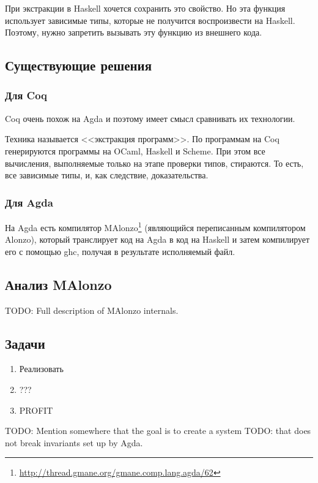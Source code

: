 При экстракции в Haskell хочется сохранить это свойство. Но эта функция
использует зависимые типы, которые не получится воспроизвести на Haskell.
Поэтому, нужно запретить вызывать эту функцию из внешнего кода.

\subsection{Существующие решения}

\subsubsection{Для Coq}

Coq очень похож на Agda и поэтому имеет смысл сравнивать их технологии.

Техника называется <<экстракция программ>>\cite{Let02}.
По программам на Coq генерируются программы на OCaml, Haskell и Scheme.
При этом все вычисления, выполняемые только на этапе проверки типов, стираются.
То есть, все зависимые типы, и, как следствие, доказательства.

\subsubsection{Для Agda}

На Agda есть компилятор
MAlonzo\footnote{\url{http://thread.gmane.org/gmane.comp.lang.agda/62}}
(являющийся переписанным компилятором Alonzo\cite{Ben07}), который транслирует
код на Agda в код на Haskell и затем компилирует его с помощью ghc, получая в
результате исполняемый файл.

\subsection{Анализ MAlonzo}

TODO: Full description of MAlonzo internals.

\subsection{Задачи}

\begin{enumerate}
\item Реализовать
\item ???
\item PROFIT
\end{enumerate}

TODO: Mention somewhere that the goal is to create a system
TODO: that does not break invariants set up by Agda.

